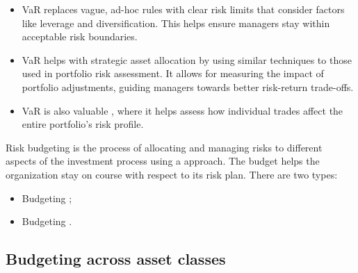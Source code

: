 
\begin{itemize}
\item {} VaR replaces vague, ad-hoc rules with clear risk
limits that consider factors like leverage and diversification. This helps ensure
managers stay within acceptable risk boundaries.
\item {} VaR helps with strategic asset allocation
by using similar techniques to those used in portfolio risk assessment. It allows
for measuring the impact of portfolio adjustments, guiding managers towards better
risk-return trade-offs.
\item VaR is also valuable , where it helps assess how
individual trades affect the entire portfolio's risk profile.
\end{itemize}


Risk budgeting is the process of allocating and managing risks to different
aspects of the investment process using a  approach. The budget
helps the organization stay on course with respect to its risk plan. There are
two types:

\begin{itemize}
\item Budgeting ;
\item Budgeting .
\end{itemize}

\subsection{Budgeting across asset classes}

